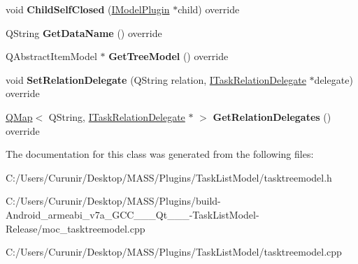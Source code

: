 \begin{DoxyCompactItemize}
\mbox{\label{class_task_tree_model_a2404b109ceb9543d52e1362556db8b94}} 
void {\bfseries Child\+Self\+Closed} (\hyperlink{class_i_model_plugin}{I\+Model\+Plugin} $\ast$child) override
\item 
\mbox{\label{class_task_tree_model_aebbc0558f83bc7f944cc6fc4ece03730}} 
Q\+String {\bfseries Get\+Data\+Name} () override
\item 
\mbox{\label{class_task_tree_model_a294c3881af033139a5387e3131a1bfb5}} 
Q\+Abstract\+Item\+Model $\ast$ {\bfseries Get\+Tree\+Model} () override
\item 
\mbox{\label{class_task_tree_model_afe93ae7affde7bc8ec07766556cb1f76}} 
void {\bfseries Set\+Relation\+Delegate} (Q\+String relation, \hyperlink{class_i_task_tree_model_1_1_i_task_relation_delegate}{I\+Task\+Relation\+Delegate} $\ast$delegate) override
\item 
\mbox{\label{class_task_tree_model_ab0438ecf0bc13627d229e63327f0e2bc}} 
\hyperlink{class_q_map}{Q\+Map}$<$ Q\+String, \hyperlink{class_i_task_tree_model_1_1_i_task_relation_delegate}{I\+Task\+Relation\+Delegate} $\ast$ $>$ {\bfseries Get\+Relation\+Delegates} () override
\end{DoxyCompactItemize}


The documentation for this class was generated from the following files\+:\begin{DoxyCompactItemize}
\item 
C\+:/\+Users/\+Curunir/\+Desktop/\+M\+A\+S\+S/\+Plugins/\+Task\+List\+Model/tasktreemodel.\+h\item 
C\+:/\+Users/\+Curunir/\+Desktop/\+M\+A\+S\+S/\+Plugins/build-\/\+Android\+\_\+armeabi\+\_\+v7a\+\_\+\+G\+C\+C\+\_\+\_\+\_\+\+Qt\+\_\+\_\+\_-\/\+Task\+List\+Model-\/\+Release/moc\+\_\+tasktreemodel.\+cpp\item 
C\+:/\+Users/\+Curunir/\+Desktop/\+M\+A\+S\+S/\+Plugins/\+Task\+List\+Model/tasktreemodel.\+cpp\end{DoxyCompactItemize}
